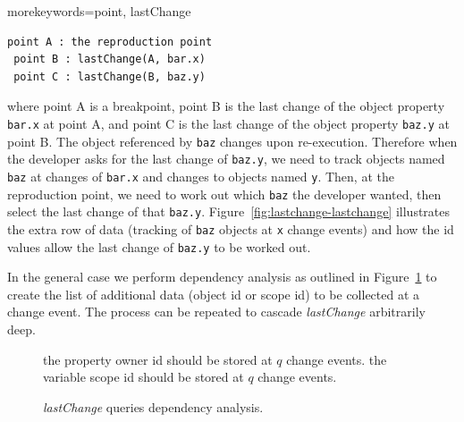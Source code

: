 \documentclass{sig-alternate}
\begin{document}
{morekeywords={point, lastChange}}

\lstset{basicstyle=\small}
\begin{lstlisting}[language=myLang2, framerule=0pt]
 point A : the reproduction point 
 point B : lastChange(A, bar.x) 
 point C : lastChange(B, baz.y) 
\end{lstlisting}


where point A is a breakpoint, point B is the last change of the object property \texttt{bar.x} at point A, and
point C is the last change of the object property \texttt{baz.y} at point B. 
The object referenced by \texttt{baz} changes upon re-execution. Therefore when the developer
asks for the last change of \texttt{baz.y}, we need to track objects named \texttt{baz}
at changes of \texttt{bar.x} and changes to objects named \texttt{y}. Then, at the reproduction point,
we need to work out which \texttt{baz} the developer wanted, then select the last change of that \texttt{baz.y}.
Figure~\ref{fig:lastchange-lastchange} illustrates the extra row of data (tracking of \texttt{baz} objects 
at \texttt{x} change events) 
and how the id values allow the last change of \texttt{baz.y} to be worked out. 
 
In the general case we perform dependency analysis  as outlined in 
Figure~\ref{fig:dependency-analysis} to
create the list of additional data (object id or scope id) to be collected at a change
event. The process can be repeated to cascade \textit{lastChange} arbitrarily deep.

\begin{figure}[htp]
\centering 
\begin{algorithmic}

     \STATE the property owner id should be stored at $q$ change events. 
     \STATE the variable scope id should be stored at $q$ change events.
	 \ENDIF 
 \ENDFOR 
\ENDFOR

\end{algorithmic}
\caption{\textit{lastChange} queries dependency analysis.}
\label{fig:dependency-analysis}
\end{figure}
\end{document}
